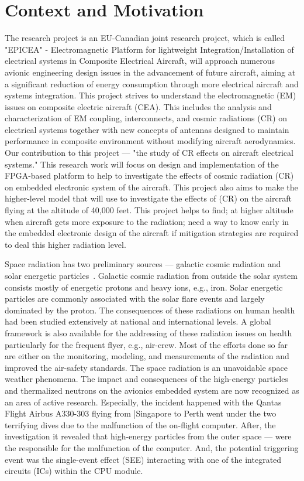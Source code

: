 
\label{sec:intro} 

\section{Context and Motivation}

The research project is an EU-Canadian joint research project, which is called "EPICEA" - Electromagnetic Platform for
lightweight Integration/Installation of electrical systems in Composite Electrical Aircraft, will approach
numerous avionic engineering design issues in the advancement of future aircraft, aiming at a significant
reduction of energy consumption through more electrical aircraft and systems integration. This project strives to understand the electromagnetic (EM) issues on composite electric aircraft (CEA). This includes the analysis
and characterization of EM coupling, interconnects, and cosmic radiations (CR) on electrical systems together
with new concepts of antennas designed to maintain performance in composite environment without modifying
aircraft aerodynamics. Our contribution to this project --- "the study of CR effects on aircraft electrical systems." This research work will focus on design and implementation of the FPGA-based platform to help to investigate the effects of cosmic radiation (CR) on embedded electronic system of the aircraft. This project also aims to make the higher-level model that will use to investigate the effects of (CR) on the aircraft flying at the altitude of 40,000 feet. This project helps to find; at higher altitude when aircraft gets more exposure to the radiation; need a way to know early in the embedded electronic design of the aircraft if mitigation strategies are required to deal this higher radiation level. 

Space radiation has two preliminary sources --- galactic cosmic radiation and solar energetic particles~\cite{SWE20216}. Galactic cosmic radiation from outside the solar system consists mostly of energetic protons and heavy ions, e.g., iron. Solar energetic particles are commonly associated with the solar flare events and largely dominated by the proton. The consequences of these radiations on human health had been studied extensively at national and international levels. A global framework is also available for the addressing of these radiation issues on health particularly for the frequent flyer, e.g., air-crew. Most of the efforts done so far are either on the monitoring, modeling, and measurements of the radiation and improved the air-safety standards. The space radiation is an unavoidable space weather phenomena. The impact and consequences of the high-energy particles and thermalized neutrons on the avionics embedded system are now recognized as an area of active research. Especially, the incident happened with the Qantas Flight Airbus A330-303 flying from |Singapore to Perth went under the two terrifying dives due to the malfunction of the on-flight computer. After, the investigation it revealed that high-energy particles from the outer space --- were the responsible for the malfunction of the computer. And, the potential triggering event was the single-event effect (SEE) interacting with one of the integrated circuits (ICs) within the CPU module. 

